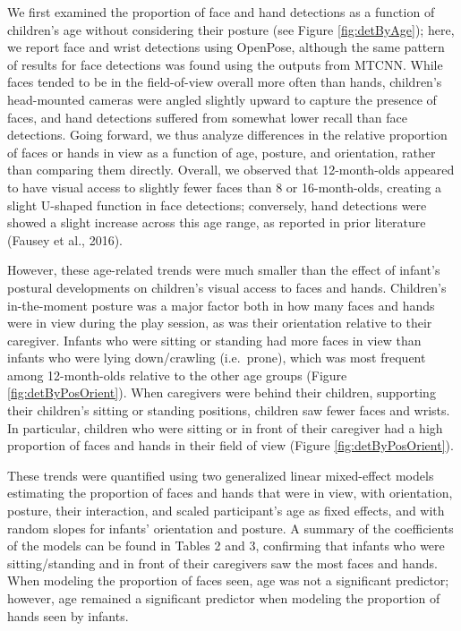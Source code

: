 \documentclass[english,man]{apa6}
\begin{document}
We first examined the proportion of face and hand detections as a
function of children's age without considering their posture (see Figure
\ref{fig:detByAge}); here, we report face and wrist detections using
OpenPose, although the same pattern of results for face detections was
found using the outputs from MTCNN. While faces tended to be in the
field-of-view overall more often than hands, children's head-mounted
cameras were angled slightly upward to capture the presence of faces,
and hand detections suffered from somewhat lower recall than face
detections. Going forward, we thus analyze differences in the relative
proportion of faces or hands in view as a function of age, posture, and
orientation, rather than comparing them directly. Overall, we observed
that 12-month-olds appeared to have visual access to slightly fewer
faces than 8 or 16-month-olds, creating a slight U-shaped function in
face detections; conversely, hand detections were showed a slight
increase across this age range, as reported in prior literature (Fausey
et al., 2016).

However, these age-related trends were much smaller than the effect of
infant's postural developments on children's visual access to faces and
hands. Children's in-the-moment posture was a major factor both in how
many faces and hands were in view during the play session, as was their
orientation relative to their caregiver. Infants who were sitting or
standing had more faces in view than infants who were lying
down/crawling (i.e.~prone), which was most frequent among 12-month-olds
relative to the other age groups (Figure \ref{fig:detByPosOrient}). When
caregivers were behind their children, supporting their children's
sitting or standing positions, children saw fewer faces and wrists. In
particular, children who were sitting or in front of their caregiver had
a high proportion of faces and hands in their field of view (Figure
\ref{fig:detByPosOrient}).

These trends were quantified using two generalized linear mixed-effect
models estimating the proportion of faces and hands that were in view,
with orientation, posture, their interaction, and scaled participant's
age as fixed effects, and with random slopes for infants' orientation
and posture. A summary of the coefficients of the models can be found in
Tables 2 and 3, confirming that infants who were sitting/standing and in
front of their caregivers saw the most faces and hands. When modeling
the proportion of faces seen, age was not a significant predictor;
however, age remained a significant predictor when modeling the
proportion of hands seen by infants.
\end{document}
